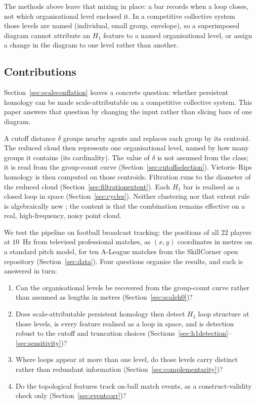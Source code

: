 The methods above leave that mixing in place: a bar records when a loop
closes, not which organisational level enclosed it. In a competitive
collective system those levels are named (individual, small group,
envelope), so a superimposed diagram cannot attribute an $H_1$ feature
to a named organisational level, or assign a change in the diagram to
one level rather than another.

\subsection{Contributions}

Section~\ref{sec:scaleconflation} leaves a concrete question: whether
persistent homology can be made scale-attributable on a competitive
collective system. This paper answers that question by changing the
input rather than slicing bars of one diagram.

A cutoff distance $\delta$ groups nearby agents and replaces each group
by its centroid. The reduced cloud then represents one organisational
level, named by how many groups it contains (its cardinality). The
value of $\delta$ is not assumed from the class; it is read from the
group-count curve (Section~\ref{sec:cutoffselection}). Vietoris--Rips
homology is then computed on those centroids. Filtration runs to the diameter of the reduced cloud
(Section~\ref{sec:filtrationextent}). Each $H_1$ bar is realised as a
closed loop in space (Section~\ref{sec:cycles}). Neither clustering
nor that extent rule is algebraically new
\citep{carlsson2010clustering,schindler2023}; the content is that the
combination remains effective on a real, high-frequency, noisy point
cloud.

We test the pipeline on football broadcast tracking: the positions of
all 22 players at $10$~Hz from televised professional matches, as
$(x,y)$ coordinates in metres on a standard pitch model, for ten
A-League matches from the SkillCorner open repository
(Section~\ref{sec:data}). Four questions organise the results, and each
is answered in turn:

\begin{enumerate}
\item\label{q:levels} Can the organisational levels be recovered from
the group-count curve rather than assumed as lengths in metres
(Section~\ref{sec:scaleh0})?
\item\label{q:homology} Does scale-attributable persistent homology
then detect \texorpdfstring{$H_1$}{} loop structure at those levels, is
every feature realised as a loop in space, and is detection robust to
the cutoff and truncation choices
(Sections~\ref{sec:h1detection}--\ref{sec:sensitivity})?
\item\label{q:distinct} Where loops appear at more than one level, do
those levels carry distinct rather than redundant information
(Section~\ref{sec:complementarity})?
\item\label{q:validity} Do the topological features track on-ball match
events, as a construct-validity check only
(Section~\ref{sec:eventcorr})?
\end{enumerate}

